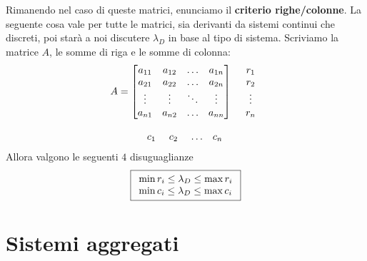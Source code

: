 Rimanendo nel caso di queste matrici, enunciamo il \textbf{criterio righe/colonne}. La seguente cosa vale per tutte le matrici, sia derivanti da sistemi continui che discreti, poi starà a noi discutere $\lambda _D$ in base al tipo di sistema. Scriviamo la matrice $A$, le somme di riga e le somme di colonna:
\begin{equation*}
	\begin{array}{ r l }
		A=\begin{bmatrix}
		a_{11} & a_{12} & \dotsc & a_{1n} \\
		a_{21} & a_{22} & \dotsc & a_{2n} \\
		\vdots & \vdots & \ddots & \vdots \\
		a_{n1} & a_{n2} & \dotsc & a_{nn} 
		\end{bmatrix} & \begin{array}{ c }
		r_1\\
		r_2\\
		\vdots \\
		r_n
	\end{array}\\
	& \\
	\begin{array}{ c c c c }
		c_{1\ } & c_{2\ } & \dotsc & c_{n\ } 
	\end{array} & 
	\end{array}
\end{equation*}
Allora valgono le seguenti $4$ disuguaglianze
\begin{equation*}
	\boxed{
		\begin{array}{{>{\displaystyle}l}}
			\min r_i \leq \lambda _D \leq \max r_i \\
			\min c_i \leq \lambda _D \leq \max c_i 
		\end{array}
	}
\end{equation*}

\chapter{Sistemi aggregati}

